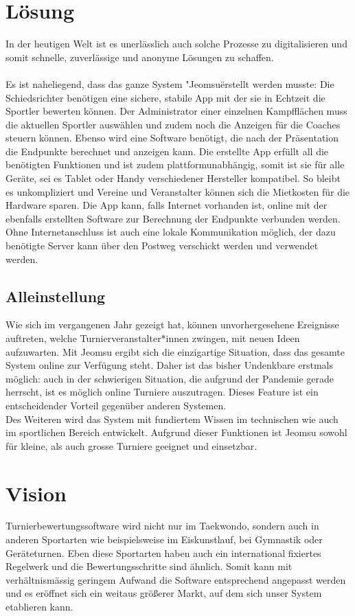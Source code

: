 \section{Lösung}
In der heutigen Welt ist es unerlässlich auch solche Prozesse zu digitalisieren und somit schnelle,
    zuverlässige und anonyme Lösungen zu schaffen.
\\\\
Es ist naheliegend, dass das ganze System "Jeomsu\" erstellt werden musste:
Die Schiedsrichter benötigen eine sichere, stabile App mit der sie in Echtzeit die Sportler bewerten können.
Der Administrator einer einzelnen Kampfflächen muss die aktuellen Sportler auswählen und zudem noch die Anzeigen für die Coaches steuern können.
Ebenso wird eine Software benötigt, die nach der Präsentation die Endpunkte berechnet und anzeigen kann. 
Die erstellte App erfüllt all die benötigten Funktionen und ist zudem plattformunabhängig, somit ist sie für alle Geräte,
    sei es Tablet oder Handy verschiedener Hersteller kompatibel.
So bleibt es unkompliziert und Vereine und Veranstalter können sich die Mietkosten für die Hardware sparen.
Die App kann, falls Internet vorhanden ist, online mit der ebenfalls erstellten Software zur Berechnung der Endpunkte verbunden werden.
Ohne Internetanschluss ist auch eine lokale Kommunikation möglich, der dazu benötigte Server kann über den
    Postweg verschickt werden und verwendet werden.

\subsection{Alleinstellung}
Wie sich im vergangenen Jahr gezeigt hat, können unvorhergesehene Ereignisse auftreten, welche Turnierveranstalter*innen
    zwingen, mit neuen Ideen aufzuwarten.
Mit Jeomsu ergibt sich die einzigartige Situation, dass das gesamte System online zur Verfügung steht.
Daher ist das bisher Undenkbare erstmals möglich: auch in der schwierigen Situation, die aufgrund der Pandemie gerade
herrscht, ist es möglich online Turniere auszutragen.
Dieses Feature ist ein entscheidender Vorteil gegenüber anderen Systemen.
\\
Des Weiteren wird das System mit fundiertem Wissen im technischen wie auch im sportlichen Bereich entwickelt.
Aufgrund dieser Funktionen ist Jeomsu sowohl für kleine, als auch grosse Turniere geeignet und einsetzbar.

\section{Vision}
Turnierbewertungssoftware wird nicht nur im Taekwondo, sondern auch in anderen Sportarten wie beispielsweise im Eiskunstlauf,
    bei Gymnastik oder Geräteturnen.
Eben diese Sportarten haben auch ein international fixiertes Regelwerk und die Bewertungsschritte sind ähnlich.
Somit kann mit verhältnismässig geringem Aufwand die Software entsprechend angepasst werden und es eröffnet sich ein
    weitaus größerer Markt, auf dem sich unser System etablieren kann.
